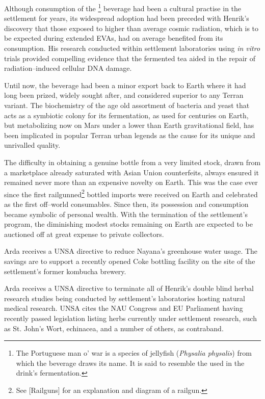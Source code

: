 Although consumption of the \footnote{The Portuguese man o' war is a species of jellyfish ({\it Physalia physalis}) from which the beverage draws its name. It is said to resemble the  used in the drink's fermentation.} beverage had been a cultural practise in the settlement for years, its widespread adoption had been preceded with Henrik's discovery that those exposed to higher than average cosmic radiation, which is to be expected during extended EVAs, had on average benefited from its consumption. His research conducted within settlement laboratories using {\it in vitro} trials provided compelling evidence that the fermented tea aided in the repair of radiation--induced cellular DNA damage. 

Until now, the beverage had been a minor export back to Earth where it had long been prized, widely sought after, and considered superior to any Terran variant. The biochemistry of the age old assortment of bacteria and yeast that acts as a symbiotic colony for its fermentation, as used for centuries on Earth, but metabolizing now on Mars under a lower than Earth gravitational field, has been implicated in popular Terran urban legends as the cause for its unique and unrivalled quality. 

The difficulty in obtaining a genuine bottle from a very limited stock, drawn from a marketplace already saturated with Asian Union counterfeits, always ensured it remained never more than an expensive novelty on Earth. This was the case ever since the first railgunned\footnote{See [Railguns] for an explanation and diagram of a railgun.} bottled imports were received on Earth and celebrated as the first off--world consumables. Since then, its possession and consumption became symbolic of personal wealth. With the termination of the settlement's program, the diminishing modest stocks remaining on Earth are expected to be auctioned off at great expense to private collectors.
\StopTimelineDate

Arda receives a UNSA directive to reduce Nayana's greenhouse water usage. The savings are to support a recently opened Coke bottling facility on the site of the settlement's former kombucha brewery.
\StopTimelineDate

Arda receives a UNSA directive to terminate all of Henrik's double blind herbal research studies being conducted by settlement's laboratories hosting natural medical research. UNSA cites the NAU Congress and EU Parliament having recently passed legislation listing herbs currently under settlement research, such as St. John's Wort, echinacea, and a number of others, as contraband. 

